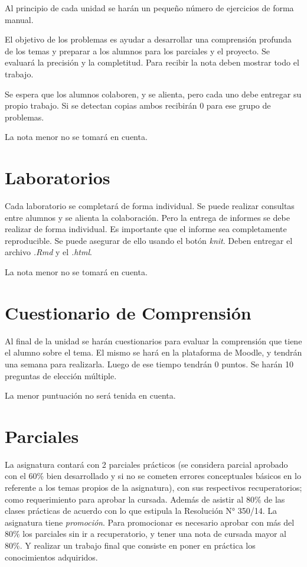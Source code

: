 \documentclass[]{book}
\theoremstyle{definition}
\theoremstyle{definition}
\theoremstyle{definition}
\theoremstyle{remark}
\begin{document}
Al principio de cada unidad se harán un pequeño número de ejercicios de
forma manual.

El objetivo de los problemas es ayudar a desarrollar una comprensión
profunda de los temas y preparar a los alumnos para los parciales y el
proyecto. Se evaluará la precisión y la completitud. Para recibir la
nota deben mostrar todo el trabajo.

Se espera que los alumnos colaboren, y se alienta, pero cada uno debe
entregar su propio trabajo. Si se detectan copias ambos recibirán 0 para
ese grupo de problemas.

La nota menor no se tomará en cuenta.

\hypertarget{laboratorios}{%
\section{Laboratorios}\label{laboratorios}}

Cada laboratorio se completará de forma individual. Se puede realizar
consultas entre alumnos y se alienta la colaboración. Pero la entrega de
informes se debe realizar de forma individual. Es importante que el
informe sea completamente reproducible. Se puede asegurar de ello usando
el botón \emph{knit}. Deben entregar el archivo \emph{.Rmd} y el
\emph{.html}.

La nota menor no se tomará en cuenta.

\hypertarget{cuestionario-de-comprension}{%
\section{Cuestionario de
Comprensión}\label{cuestionario-de-comprension}}

Al final de la unidad se harán cuestionarios para evaluar la comprensión
que tiene el alumno sobre el tema. El mismo se hará en la plataforma de
Moodle, y tendrán una semana para realizarla. Luego de ese tiempo
tendrán 0 puntos. Se harán 10 preguntas de elección múltiple.

La menor puntuación no será tenida en cuenta.

\hypertarget{parciales}{%
\section{Parciales}\label{parciales}}

La asignatura contará con 2 parciales prácticos (se considera parcial
aprobado con el 60\% bien desarrollado y si no se cometen errores
conceptuales básicos en lo referente a los temas propios de la
asignatura), con sus respectivos recuperatorios; como requerimiento para
aprobar la cursada. Además de asistir al 80\% de las clases prácticas de
acuerdo con lo que estipula la Resolución N° 350/14. La asignatura tiene
\emph{promoción}. Para promocionar es necesario aprobar con más del 80\%
los parciales sin ir a recuperatorio, y tener una nota de cursada mayor
al 80\%. Y realizar un trabajo final que consiste en poner en práctica
los conocimientos adquiridos.
\end{document}
